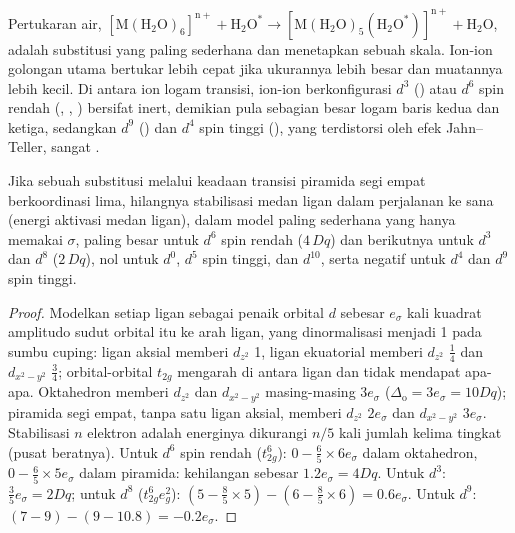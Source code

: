 Pertukaran air, $\mathrm{[M(H_2O)_6]^{n+} + H_2O^{\ast} \to [M(H_2O)_5(H_2O^{\ast})]^{n+} + H_2O}$, adalah substitusi
yang paling sederhana dan menetapkan sebuah skala. Ion-ion golongan utama
bertukar lebih cepat jika ukurannya lebih besar dan muatannya lebih kecil.
Di antara ion logam transisi, ion-ion berkonfigurasi $d^3$
() atau $d^6$ spin rendah (, , ) bersifat inert, demikian pula
sebagian besar logam baris kedua dan ketiga, sedangkan $d^9$ () dan $d^4$ spin tinggi (),
yang terdistorsi oleh efek Jahn--Teller, sangat .

\begin{proposition}\label{prop:b3:complex-mechanisms:lfae}
Jika sebuah substitusi melalui keadaan transisi piramida segi empat berkoordinasi
lima, hilangnya stabilisasi medan ligan dalam perjalanan ke sana (energi aktivasi
medan ligan), dalam model paling sederhana yang hanya memakai $\sigma$, paling besar untuk $d^6$ spin rendah
($4\,Dq$) dan berikutnya untuk $d^3$ dan $d^8$ ($2\,Dq$), nol untuk $d^0$, $d^5$ spin tinggi, dan $d^{10}$, serta negatif
untuk $d^4$ dan $d^9$ spin tinggi.
\end{proposition}

\begin{proof}
Modelkan setiap ligan sebagai penaik orbital $d$ sebesar $e_\sigma$ kali kuadrat amplitudo
sudut orbital itu ke arah ligan, yang dinormalisasi menjadi 1 pada sumbu cuping: ligan
aksial memberi $d_{z^2}$ 1, ligan ekuatorial memberi $d_{z^2}$ $\frac14$ dan $d_{x^2-y^2}$ $\frac34$; orbital-orbital $t_{2g}$ mengarah
di antara ligan dan tidak mendapat apa-apa. Oktahedron memberi $d_{z^2}$ dan $d_{x^2-y^2}$ masing-masing $3e_\sigma$
($\Delta_{\mathrm o} = 3e_\sigma = 10Dq$); piramida segi empat, tanpa satu ligan aksial, memberi $d_{z^2}$ $2e_\sigma$ dan
$d_{x^2-y^2}$ $3e_\sigma$. Stabilisasi $n$ elektron adalah energinya dikurangi $n/5$ kali jumlah
kelima tingkat (pusat beratnya). Untuk $d^6$ spin rendah ($t_{2g}^6$): $0 - \frac65 \times 6e_\sigma$ dalam
oktahedron, $0 - \frac65 \times 5e_\sigma$ dalam piramida: kehilangan sebesar $1.2e_\sigma = 4Dq$. Untuk $d^3$: $\frac35e_\sigma =
2Dq$; untuk $d^8$ ($t_{2g}^6e_g^2$): $(5 - \frac85 \times 5) - (6 - \frac85 \times 6) = 0.6e_\sigma$. Untuk $d^9$: $(7 - 9) - (9 -
10.8) = -0.2e_\sigma$.
\end{proof}

